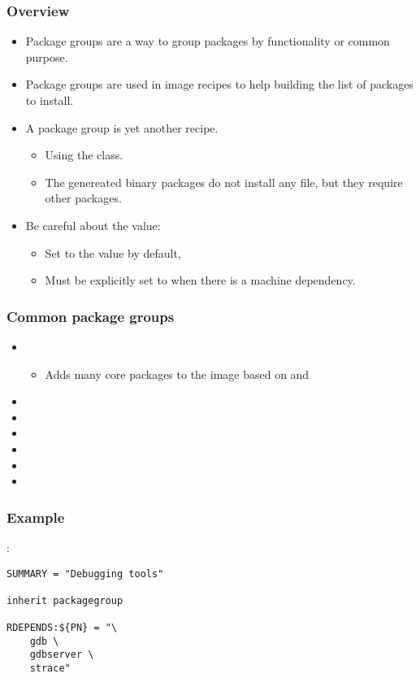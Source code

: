 \begin{frame}
  \frametitle{Overview}
  \begin{itemize}
    \item Package groups are a way to group packages by functionality or
      common purpose.
    \item Package groups are used in image recipes to help building
      the list of packages to install.
    \item A package group is yet another recipe.
      \begin{itemize}
        \item Using the  class.
        \item The genereated binary packages do not install any file, but
          they require other packages.
      \end{itemize}
    \item Be careful about the  value:
      \begin{itemize}
      \item Set to the value  by default,
      \item Must be explicitly set to  when there is a machine
        dependency.
      \end{itemize}
  \end{itemize}
\end{frame}

\begin{frame}
  \frametitle{Common package groups}
  \begin{itemize}
    \item {}
      \begin{itemize}
        \item Adds many core packages to the image based on
           and 
      \end{itemize}
    \item {}
    \item {}
    \item {}
    \item {}
    \item {}
    \item {}
  \end{itemize}
\end{frame}

\begin{frame}[fragile]
  \frametitle{Example}
  :
  \begin{block}{}
    \begin{verbatim}
SUMMARY = "Debugging tools"

inherit packagegroup

RDEPENDS:${PN} = "\
    gdb \
    gdbserver \
    strace"
    \end{verbatim}
  \end{block}
\end{frame}
